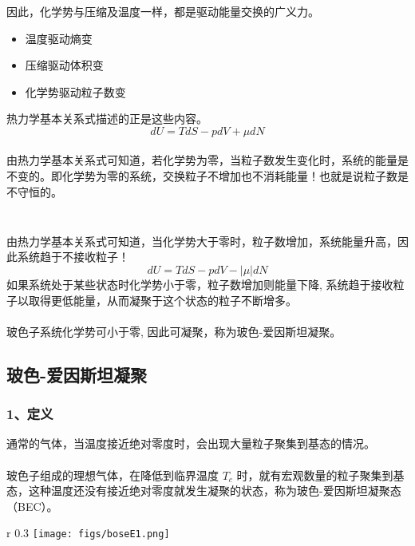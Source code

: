 \begin{frame}
  \frametitle{}
  因此，化学势与压缩及温度一样，都是驱动能量交换的广义力。
  \begin{itemize}
    \item 温度驱动熵变
    \item 压缩驱动体积变
    \item 化学势驱动粒子数变
  \end{itemize} 
  热力学基本关系式描述的正是这些内容。
  \[ dU = TdS - pdV + \mu dN \]
  \emf[讨论-2：化学势等于零] \\
  由热力学基本关系式可知道，若化学势为零，当粒子数发生变化时，系统的能量是不变的。即化学势为零的系统，交换粒子不增加也不消耗能量！也就是说粒子数是不守恒的。
\end{frame} 

\begin{frame}
  \frametitle{}
  \emf[讨论-3：化学势小于零] \\
  由热力学基本关系式可知道，当化学势大于零时，粒子数增加，系统能量升高，因此系统趋于不接收粒子！
  \[ dU = TdS - pdV - \left\vert\mu \right\vert dN \]
  如果系统处于某些状态时化学势小于零，粒子数增加则能量下降, 系统趋于接收粒子以取得更低能量，从而凝聚于这个状态的粒子不断增多。\\
 ~~\\ 
  {玻色子系统化学势可小于零}, 因此可凝聚，称为玻色-爱因斯坦凝聚。
\end{frame} 

\subsection{玻色-爱因斯坦凝聚}

\begin{frame}
  \frametitle{ 1、定义 }
  通常的气体，当温度接近绝对零度时，会出现大量粒子聚集到基态的情况。\\
  ~~\\ 
  玻色子组成的理想气体，在降低到临界温度 $T_c$ 时，就有宏观数量的粒子聚集到基态，这种温度还没有接近绝对零度就发生凝聚的状态，称为玻色-爱因斯坦凝聚态（BEC）。
  \begin{wrapfigure} {r} {0.3\textwidth} %
    \texttt{[image: figs/boseE1.png]}   
\end{wrapfigure}
\end{frame} 

